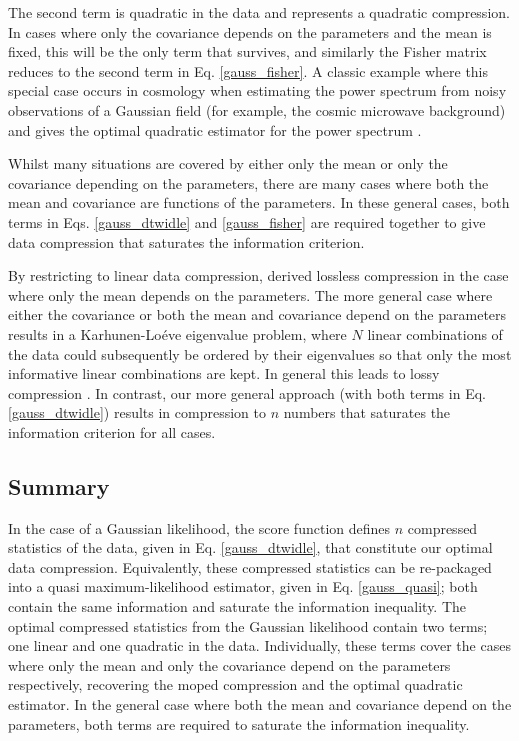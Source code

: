 \documentclass[fleqn,usenatbib]{mnras}
\begin{document}
The second term is quadratic in the data and represents a quadratic compression. In cases where only the covariance depends on the parameters and the mean is fixed, this will be the only term that survives, and similarly the Fisher matrix reduces to the second term in Eq. \eqref{gauss_fisher}. A classic example where this special case occurs in cosmology when estimating the power spectrum from noisy observations of a Gaussian field (for example, the cosmic microwave background) and gives the optimal quadratic estimator for the power spectrum \citep{1997PhRvD..55.5895T,Bond1998,Bond2000}.

Whilst many situations are covered by either only the mean or only the covariance depending on the parameters, there are many cases where both the mean and covariance are functions of the parameters. In these general cases, both terms in Eqs. \eqref{gauss_dtwidle} and \eqref{gauss_fisher} are required together to give data compression that saturates the information criterion. 

By restricting to linear data compression, \citet{Heavens2000a} derived lossless compression in the case where only the mean depends on the parameters. The more general case where either the covariance or both the mean and covariance depend on the parameters results in a Karhunen-Lo\'{e}ve eigenvalue problem, where $N$ linear combinations of the data  could subsequently be ordered by their eigenvalues so that only the most informative linear combinations are kept. In general this leads to lossy compression \citep{Tegmark1997}. In contrast, our more general approach (with both terms in Eq. \eqref{gauss_dtwidle}) results in compression to $n$ numbers that saturates the information criterion for all cases.
%
\subsection*{Summary}
%
In the case of a Gaussian likelihood, the score function defines $n$ compressed statistics of the data, given in Eq. \eqref{gauss_dtwidle}, that constitute our optimal data compression. Equivalently, these compressed statistics can be re-packaged into a quasi maximum-likelihood estimator, given in Eq. \eqref{gauss_quasi}; both contain the same information and saturate the information inequality. The optimal compressed statistics from the Gaussian likelihood contain two terms; one linear and one quadratic in the data. Individually, these terms cover the cases where only the mean and only the covariance depend on the parameters respectively, recovering the {\sc moped} compression and the optimal quadratic estimator. In the general case where both the mean and covariance depend on the parameters, both terms are required to saturate the information inequality.
%
%
\end{document}
